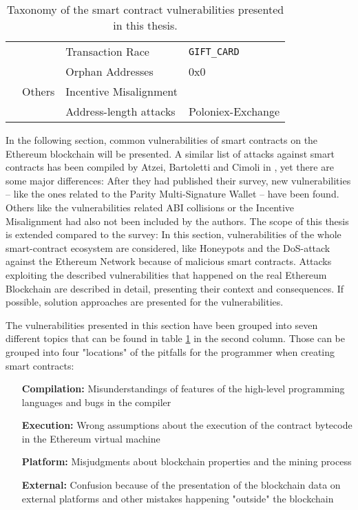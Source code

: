 \begin{table}[]
{\begin{tabular}{@{}llll@{}}
			                                           &                                       & Transaction Race                        & \texttt{GIFT\_CARD}     \\ \cline{2-4}
			                                           & \multirow{3}{*}{Others}               & Orphan Addresses                        & 0x0                     \\
			                                           &                                       & Incentive Misalignment                  &                         \\
			                                           &                                       & Address-length attacks                  & Poloniex-Exchange       \\ \hline
		\end{tabular}%
	}
	\caption{Taxonomy of the smart contract vulnerabilities presented in this thesis.}
	\label{table:taxonomy}
\end{table}

In the following section, common vulnerabilities of smart contracts on the Ethereum blockchain will be presented. A similar list of attacks against smart contracts has been compiled by Atzei, Bartoletti and Cimoli in \cite{atzei:attacksurvey}, yet there are some major differences: After they had published their survey, new vulnerabilities -- like the ones related to the Parity Multi-Signature Wallet -- have been found. Others like the vulnerabilities related ABI collisions or the Incentive Misalignment had also not been included by the authors. The scope of this thesis is extended compared to the survey: In this section, vulnerabilities of the whole smart-contract ecosystem are considered, like Honeypots and the DoS-attack against the Ethereum Network because of malicious smart contracts. Attacks exploiting the described vulnerabilities that happened on the real Ethereum Blockchain are described in detail, presenting their context and consequences. If possible, solution approaches are presented for the vulnerabilities.

The vulnerabilities presented in this section have been grouped into seven different topics that can be found in table \ref{table:taxonomy} in the second column. Those can be grouped into four "locations" of the pitfalls for the programmer when creating smart contracts:

\begin{itemize}
	\item[\textbf{Compilation:}] Misunderstandings of features of the high-level programming languages and bugs in the compiler
	\item[\textbf{Execution:}] Wrong assumptions about the execution of the contract bytecode in the Ethereum virtual machine
	\item[\textbf{Platform:}] Misjudgments about blockchain properties and the mining process
	\item[\textbf{External:}] Confusion because of the presentation of the blockchain data on external platforms and other mistakes happening "outside" the blockchain
\end{itemize}

